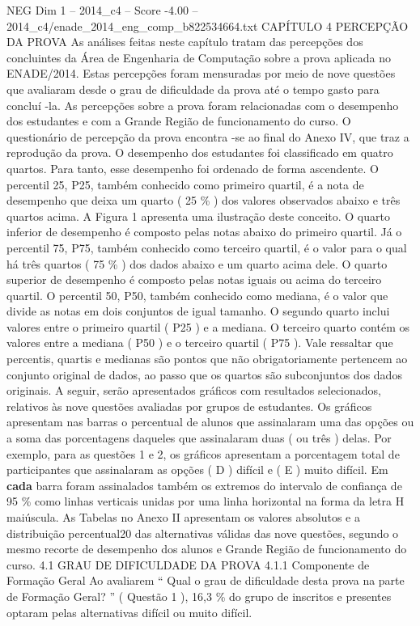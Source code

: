 \begin{textsample}{NEG Dim 1 – 2014\_c4 – Score -4.00 – 2014\_c4/enade\_2014\_eng\_comp\_b822534664.txt}  \label{ex:f1_neg_127}
CAPÍTULO 4 PERCEPÇÃO DA PROVA As análises feitas neste capítulo tratam das percepções dos concluintes da Área de Engenharia de Computação sobre a prova aplicada no ENADE/2014.
Estas percepções foram mensuradas por meio de nove questões que avaliaram desde o grau de dificuldade da prova até o tempo gasto para concluí -la.
As percepções sobre a prova foram relacionadas com o desempenho dos estudantes e com a Grande Região de funcionamento do curso.
O questionário de percepção da prova encontra -se ao final do Anexo IV, que traz a reprodução da prova.
O desempenho dos estudantes foi classificado em quatro quartos.
Para tanto, esse desempenho foi ordenado de forma ascendente.
O percentil 25, P25, também conhecido como primeiro quartil, é a nota de desempenho que deixa um quarto ( 25 \% ) dos valores observados abaixo e três quartos acima.
A Figura 1 apresenta uma ilustração deste conceito.
O quarto inferior de desempenho é composto pelas notas abaixo do primeiro quartil.
Já o percentil 75, P75, também conhecido como terceiro quartil, é o valor para o qual há três quartos ( 75 \% ) dos dados abaixo e um quarto acima dele.
O quarto superior de desempenho é composto pelas notas iguais ou acima do terceiro quartil.
O percentil 50, P50, também conhecido como mediana, é o valor que divide as notas em dois conjuntos de igual tamanho.
O segundo quarto inclui valores entre o primeiro quartil ( P25 ) e a mediana.
O terceiro quarto contém os valores entre a mediana ( P50 ) e o terceiro quartil ( P75 ).
Vale ressaltar que percentis, quartis e medianas são pontos que não obrigatoriamente pertencem ao conjunto original de dados, ao passo que os quartos são subconjuntos dos dados originais.
A seguir, serão apresentados gráficos com resultados selecionados, relativos às nove questões avaliadas por grupos de estudantes.
Os gráficos apresentam nas barras o percentual de alunos que assinalaram uma das opções ou a soma das porcentagens daqueles que assinalaram duas ( ou três ) delas.
Por exemplo, para as questões 1 e 2, os gráficos apresentam a porcentagem total de participantes que assinalaram as opções ( D ) difícil e ( E ) muito difícil.
Em \textbf{cada} barra foram assinalados também os extremos do intervalo de confiança de 95 \% como linhas verticais unidas por uma linha horizontal na forma da letra H maiúscula.
As Tabelas no Anexo II apresentam os valores absolutos e a distribuição percentual20 das alternativas válidas das nove questões, segundo o mesmo recorte de desempenho dos alunos e Grande Região de funcionamento do curso. 4.1 GRAU DE DIFICULDADE DA PROVA 4.1.1 Componente de Formação Geral Ao avaliarem “ Qual o grau de dificuldade desta prova na parte de Formação Geral? ” ( Questão 1 ), 16,3 \% do grupo de inscritos e presentes optaram pelas alternativas difícil ou muito difícil.

\end{textsample}
